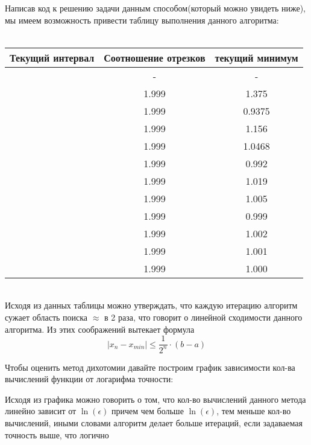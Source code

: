 \documentclass[a4paper, 14pt]{article}
\begin{document}
	Написав код к решению задачи данным способом(который можно увидеть ниже), мы имеем возможность привести таблицу выполнения данного алгоритма:\\\\
	\begin{tabular}{|c |c| c|}
		\hline
		Текущий интервал & Соотношение отрезков & текущий минимум \\
		\hline
		[0.5, 4] & - & - \\
		\hline
		[0.5, 2.25] & 1.999 & 1.375 \\
		\hline
		[0.5 1.375] & 1.999 & 0.9375 \\
		\hline
		[0.973, 1.375] & 1.999 & 1.156 \\
		\hline
		[0.973, 1.156] & 1.999 & 1.0468 \\
		\hline
		[0.973, 1.0468] & 1.999 & 0.992 \\
		\hline
		[0.992, 1.0468] & 1.999 & 1.019 \\
		\hline
		[0.992, 1.019] & 1.999 & 1.005 \\
		\hline
		[0.992, 1.005] & 1.999 & 0.999 \\
		\hline
		[0.999, 1.005] & 1.999 & 1.002 \\
		\hline
		[0.999, 1.002] & 1.999 & 1.001 \\
		\hline
		[0.999, 1.001] & 1.999 & 1.000 \\
		\hline
	\end{tabular} \\

	Исходя из данных таблицы можно утверждать, что каждую итерацию алгоритм сужает область поиска $\approx$ в 2 раза, что говорит о линейной сходимости данного алгоритма. Из этих соображений вытекает формула
	\[|x_n - x_{min}| \leqslant \frac{1}{2^n} \cdot (b - a)\]

	Чтобы оценить метод дихотомии давайте построим график зависимости кол-ва вычислений функции от логарифма точности:



	Исходя из графика можно говорить о том, что кол-во вычислений данного метода линейно зависит от $\ln(\epsilon)$ причем чем больше $\ln(\epsilon)$, тем меньше кол-во вычислений, иными словами алгоритм делает больше итераций, если задаваемая точность выше, что логично
\end{document}
